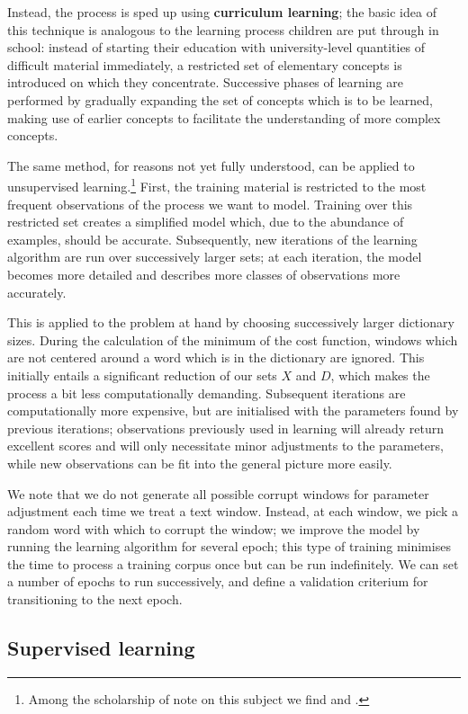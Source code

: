 Instead, the process is sped up using \textbf{curriculum learning};
the basic idea of this technique is analogous to the learning process
children are put through in school: instead of starting their
education with university-level quantities of difficult material
immediately, a restricted set of elementary concepts is introduced on
which they concentrate. Successive phases of learning are performed by
gradually expanding the set of concepts which is to be learned, making
use of earlier concepts to facilitate the understanding of more
complex concepts.

The same method, for reasons not yet fully understood, can be applied
to unsupervised learning.\footnote{Among the scholarship of note on
  this subject we find \citet{bengio2009curriculum} and
  \citet{erhan2010}.} First, the training material is restricted to the
most frequent observations of the process we want to model. Training
over this restricted set creates a simplified model which, due to the
abundance of examples, should be accurate. Subsequently, new
iterations of the learning algorithm are run over successively larger
sets; at each iteration, the model becomes more detailed and describes
more classes of observations more accurately.

This is applied to the problem at hand by choosing
successively larger dictionary sizes. During the calculation of the
minimum of the cost function, windows which are not centered around a
word which is in the dictionary are ignored. This initially entails a
significant reduction of our sets $X$ and $D$, which makes the process
a bit less computationally demanding. Subsequent iterations are
computationally more expensive, but are initialised with the
parameters found by previous iterations; observations previously used
in learning will already return excellent scores and will only
necessitate minor adjustments to the parameters, while new
observations can be fit into the general picture more easily.

We note that we do not generate all possible corrupt windows for
parameter adjustment each time we treat a text window. Instead, at
each window, we pick a random word with which to corrupt the window;
we improve the model by running the learning algorithm for several
epoch; this type of training minimises the time to process a training
corpus once but can be run indefinitely. We can set a number of epochs
to run successively, and define a validation criterium for
transitioning to the next epoch.

\subsection{Supervised learning}
\label{sec:supervised}

